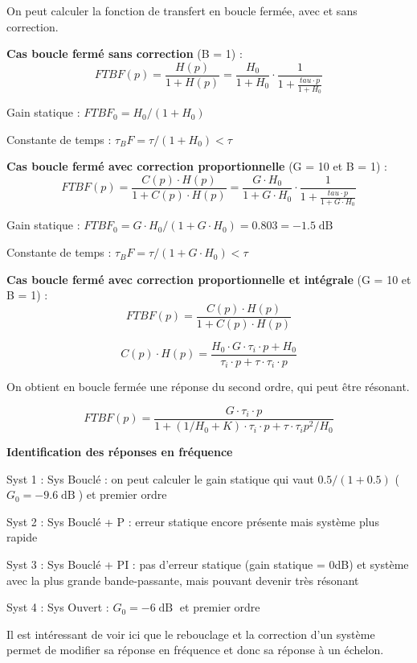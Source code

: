 \documentclass[a4paper,french]{paper}
\begin{document}
On peut calculer la fonction de transfert en boucle fermée, avec et sans correction.
	
	\textbf{Cas boucle fermé sans correction} (B = 1) : 
	$$FTBF(p) = \frac{H(p)}{1 + H(p)} = \frac{H_0}{1 + H_0} \cdot \frac{1}{1 + \frac{tau \cdot p}{1 + H_0}}$$
	
	Gain statique : $FTBF_0 = H_0 / (1 + H_0)$
	
	Constante de temps : $\tau_BF = \tau / (1 + H_0) < \tau$
	
	\textbf{Cas boucle fermé avec correction proportionnelle} (G = 10 et B = 1) : 
	$$FTBF(p) = \frac{C(p) \cdot H(p)}{1 + C(p) \cdot  H(p)} = \frac{G \cdot H_0}{1 + G \cdot H_0} \cdot \frac{1}{1 + \frac{tau \cdot p}{1 + G \cdot H_0}}$$	
	
	Gain statique : $FTBF_0 = G \cdot H_0 / (1 + G \cdot H_0) = 0.803 = -1.5\operatorname{dB}$
	
	Constante de temps : $\tau_BF = \tau / (1 + G \cdot H_0) < \tau$
	

	\textbf{Cas boucle fermé avec correction proportionnelle et intégrale} (G = 10 et B = 1) : 
	$$FTBF(p) = \frac{C(p) \cdot H(p)}{1 + C(p) \cdot  H(p)}$$	
	
	$$C(p) \cdot  H(p) = \frac{H_0 \cdot G \cdot \tau_i \cdot p + H_0}{\tau_i \cdot p + \tau \cdot \tau_i \cdot p}$$

	On obtient en boucle fermée une réponse du second ordre, qui peut être résonant.
	
	$$FTBF(p) = \frac{G \cdot \tau_i \cdot p}{1 + (1/H_0 + K) \cdot \tau_i \cdot p + \tau \cdot \tau_i p^2 / H_0}$$	


	\textbf{Identification des réponses en fréquence} 

	Syst 1 : Sys Bouclé : on peut calculer le gain statique qui vaut $0.5/(1+0.5)$ ($G_0 = -9.6\operatorname{dB}$) et premier ordre

	Syst 2 : Sys Bouclé + P : erreur statique encore présente mais système plus rapide

	Syst 3 : Sys Bouclé + PI : pas d'erreur statique (gain statique = 0dB) et système avec la plus grande bande-passante, mais pouvant devenir très résonant

	Syst 4 : Sys Ouvert : $G_0 = -6\operatorname{dB}$ et premier ordre
	
	Il est intéressant de voir ici que le rebouclage et la correction d'un système permet de modifier sa réponse en fréquence et donc sa réponse à un échelon.
\end{document}
